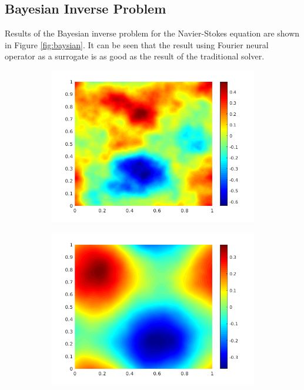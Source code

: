 \documentclass{article} %
\begin{document}
\subsection{Bayesian Inverse Problem}
\label{app:bayesian}
Results of the Bayesian inverse problem for the Navier-Stokes equation are shown in Figure \ref{fig:baysian}. It can be seen that the result using Fourier neural operator as a surrogate is as good as the result of the traditional solver.

\begin{figure}[t]
    \centering
    \begin{subfigure}[b]{0.32\textwidth}
        \includegraphics[width=\textwidth]{figs/u_truth.png}
    \end{subfigure}
    \begin{subfigure}[b]{0.32\textwidth}
        \includegraphics[width=\textwidth]{figs/umean_truth.png}

\end{subfigure}
\end{figure}
\end{document}
